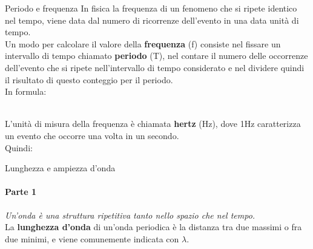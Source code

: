 \documentclass[aspectratio=169]{beamer}
\newcommand*{\vet}{\fontfamily{qzc}\selectfont}
\begin{document}
\begin{frame}{Periodo e frequenza}
	In fisica la frequenza di un fenomeno che si ripete identico nel tempo, viene data dal numero di ricorrenze dell'evento in una data unità di tempo.\\
	\smallskip
	Un modo per calcolare il valore della \textbf{frequenza} ({\vet f}) consiste nel fissare un intervallo di tempo chiamato \textbf{periodo} (T), nel contare il numero delle occorrenze dell'evento che si ripete nell'intervallo di tempo considerato e nel dividere quindi il risultato di questo conteggio per il periodo.\\
	In formula:\\
	\medskip
	\centering{{\textcolor{red!80}{{\vet f} = $\frac{1}{T}$}}}\\
	\medskip
	\raggedright{L'unità di misura della frequenza è chiamata \textbf{hertz} (Hz), dove 1Hz caratterizza un evento che occorre una volta in un secondo.}\\
	Quindi:\\
\end{frame}

\begin{frame}{Lunghezza e ampiezza d'onda}
	\framesubtitle{Parte 1}
	\emph{Un'onda è una struttura ripetitiva tanto nello spazio che nel tempo.}\\
	\smallskip
	La \textbf{lunghezza d'onda} di un'onda periodica è la distanza tra due massimi o fra due minimi, e viene comunemente indicata con $\lambda$.\\
\end{frame}
\end{document}
